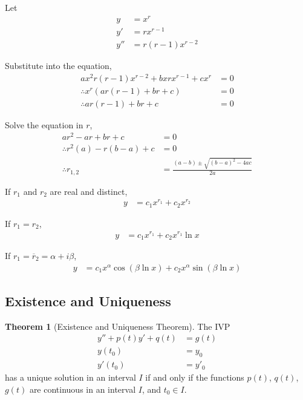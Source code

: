 \documentclass[fleqn, a4paper, 8pt, twoside]{amsart}
\theoremstyle{definition}
\theoremstyle{theorem}
\newtheorem{theorem}{Theorem}
\begin{document}
\begin{multicols}{2}
\begin{spacing}{0.85}
\begin{algorithmic}[1]
	\item
		Let
		\begin{align*}
			y   & = x^r         \\
			y'  & = r x^{r - 1} \\
			y'' & = r (r - 1) x^{r - 2}
		\end{align*}
	\item
		Substitute into the equation,
		\begin{align*}
			a x^2 r (r - 1) x^{r - 2} + b x r x^{r - 1} + c x^r & = 0 \\
			\therefore x^r \left( a r (r - 1) + b r + c \right) & = 0 \\
			\therefore a r (r - 1) + b r + c                    & = 0
		\end{align*}
	\item
		Solve the equation in $r$,
		\begin{align*}
			a r^2 - a r + b r + c &= 0\\
			\therefore r^2 (a) - r (b - a) + c &= 0\\
			\therefore r_{1,2} &= \frac{(a - b) \pm \sqrt{(b - a)^2 - 4 a c}}{2 a}
		\end{align*}

		\item
			If $r_1$ and $r_2$ are real and distinct,
			\begin{align*}
				y &= c_1 x^{r_1} + c_2 x^{r_2}
			\end{align*}
		\item
			If $r_1 = r_2$,
			\begin{align*}
				y &= c_1 x^{r_1} + c_2 x^{r_1} \ln x
			\end{align*}
		\item
			If $r_1 = \overline r_2 = \alpha + i \beta$,
			\begin{align*}
				y &= c_1 x^{\alpha} \cos(\beta \ln x) + c_2 x^{\alpha} \sin(\beta \ln x)
			\end{align*}
\end{algorithmic}

\subsection{Existence and Uniqueness}

\begin{theorem}[Existence and Uniqueness Theorem]
	The IVP
	\begin{align*}
		y'' + p(t) y' + q(t) &= g(t)\\
		y(t_0) &= y_0\\
		y'(t_0) &=y'_0
	\end{align*}
	has a unique solution in an interval $I$ if and only if the functions $p(t)$, $q(t)$, $g(t)$ are continuous in an interval $I$, and $t_0 \in I$.
\end{theorem}


\end{spacing}
\end{multicols}
\end{document}
